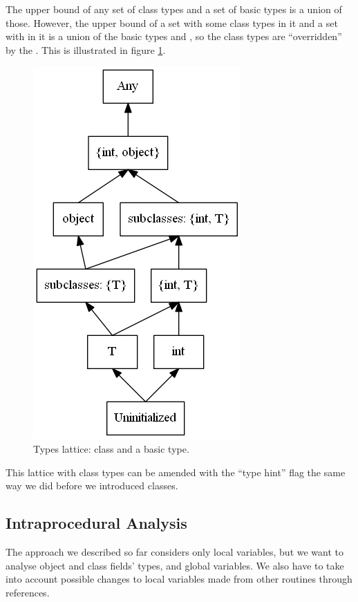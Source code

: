         The upper bound of any set of class types and a set of 
        basic types is a union of those. However, the upper 
        bound of a set with some class types in it and a set with 
         in it is a union of the basic types and 
        , so the class types are ``overridden'' by 
        the . This is illustrated in figure \ref{objectsandbasics}.
        
        \begin{figure}[h]  
          \centering        
          \includegraphics[scale=0.5]{graphs/objects-prim.png}
          \caption{Types lattice: class and a basic type.\label{objectsandbasics}}    
        \end{figure}
        
        This lattice with class types can be amended with the ``type hint'' 
        flag the same way we did before we introduced classes.
        
        \subsection{Intraprocedural Analysis}
        
        The approach we described so far considers only local variables, 
        but we want to analyse object and class fields' types, and global 
        variables. We also have to take into account possible changes to 
        local variables made from other routines through references.
        
